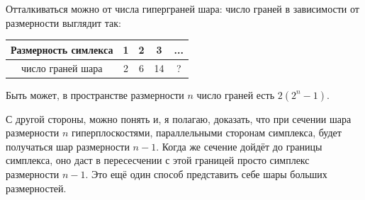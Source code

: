\documentclass[12pt]{report}
\begin{document}
Отталкиваться можно от числа гиперграней шара: число граней в зависимости от размерности выглядит так:

\begin{center}
\begin{tabular}{|c|c|c|c|c|}
\hline
Размерность симлекса & 1 & 2 & 3 & ...\\
\hline
число граней шара & 2 & 6 & 14 & ? \\
\hline
\end{tabular}
\end{center}

Быть может, в пространстве размерности $n$ число граней есть $2 (2^n - 1)$. 

С другой стороны, можно понять и, я полагаю, доказать, что при сечении шара размерности $n$ гиперплоскостями, параллельными сторонам симплекса, будет получаться шар размерности $n - 1$. Когда же сечение дойдёт до границы симплекса, оно даст в пересесчении с этой границей просто симплекс размерности $n-1$. Это ещё один способ представить себе шары больших размерностей.
\end{document}
